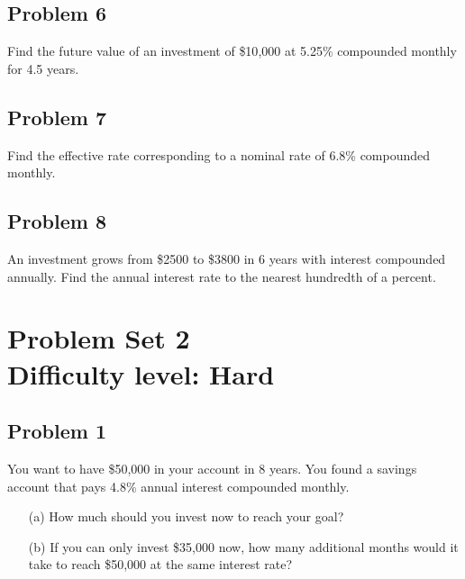 \documentclass[12pt]{article}
\begin{document}
\subsection*{Problem 6}
Find the future value of an investment of \$10{,}000 at 5.25\% compounded monthly for 4.5 years.

\subsection*{Problem 7}
Find the effective rate corresponding to a nominal rate of 6.8\% compounded monthly.

\subsection*{Problem 8}
An investment grows from \$2500 to \$3800 in 6 years with interest compounded annually. Find the annual interest rate to the nearest hundredth of a percent.

\section*{Problem Set 2\\Difficulty level: Hard}
\subsection*{Problem 1}
You want to have \$50{,}000 in your account in 8 years. You found a savings account that pays 4.8\% annual interest compounded monthly.

\begin{itemize}
    \item[(a)] How much should you invest now to reach your goal?
    \item[(b)] If you can only invest \$35{,}000 now, how many additional months would it take to reach \$50{,}000 at the same interest rate?
\end{itemize}
\end{document}

